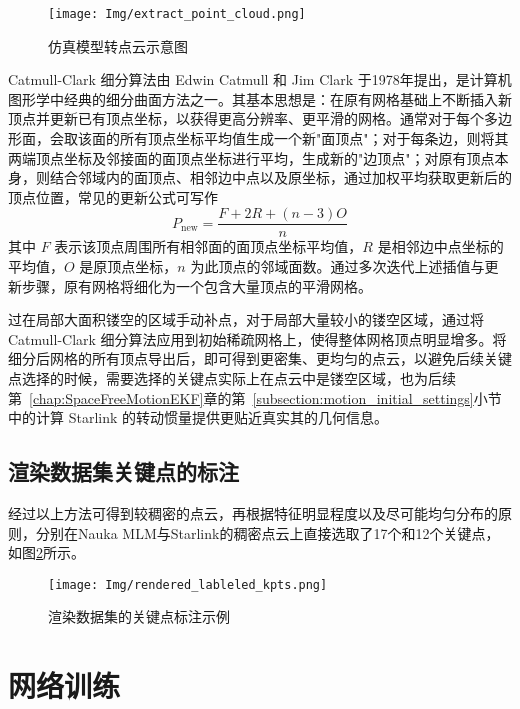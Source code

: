 \begin{figure}[htbp]
	\centering
	\texttt{[image: Img/extract\_point\_cloud.png]}
	\caption{仿真模型转点云示意图}
	\label{fig:model2pointcloud}
\end{figure}


Catmull-Clark 细分算法由 Edwin Catmull 和 Jim Clark 于1978年提出，是计算机图形学中经典的细分曲面方法之一。其基本思想是：在原有网格基础上不断插入新顶点并更新已有顶点坐标，以获得更高分辨率、更平滑的网格。通常对于每个多边形面，会取该面的所有顶点坐标平均值生成一个新"面顶点"；对于每条边，则将其两端顶点坐标及邻接面的面顶点坐标进行平均，生成新的"边顶点"；对原有顶点本身，则结合邻域内的面顶点、相邻边中点以及原坐标，通过加权平均获取更新后的顶点位置，常见的更新公式可写作
\begin{equation}
	P_{\mathrm{new}} = \frac{F + 2R + (n-3)O}{n}
\end{equation}
其中 $F$ 表示该顶点周围所有相邻面的面顶点坐标平均值，$R$ 是相邻边中点坐标的平均值，$O$ 是原顶点坐标，$n$ 为此顶点的邻域面数。通过多次迭代上述插值与更新步骤，原有网格将细化为一个包含大量顶点的平滑网格。

过在局部大面积镂空的区域手动补点，对于局部大量较小的镂空区域，通过将 Catmull-Clark 细分算法应用到初始稀疏网格上，使得整体网格顶点明显增多。将细分后网格的所有顶点导出后，即可得到更密集、更均匀的点云，以避免后续关键点选择的时候，需要选择的关键点实际上在点云中是镂空区域，也为后续第~\ref{chap:SpaceFreeMotionEKF}章的第~\ref{subsection:motion_initial_settings}小节中的计算 Starlink 的转动惯量提供更贴近真实其的几何信息。

\subsection{渲染数据集关键点的标注}

经过以上方法可得到较稠密的点云，再根据特征明显程度以及尽可能均匀分布的原则，分别在Nauka MLM与Starlink的稠密点云上直接选取了17个和12个关键点，如图\ref{fig:rendered_lableled_kpts}所示。

\begin{figure}[htbp]
	\centering
	\texttt{[image: Img/rendered\_lableled\_kpts.png]}
	\caption{渲染数据集的关键点标注示例}
	\label{fig:rendered_lableled_kpts}
\end{figure}



\section{网络训练}

